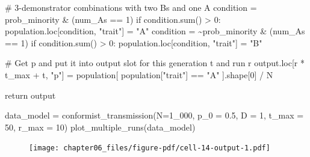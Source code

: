 \documentclass[
  a4paperpaper,
  ,captions=tableheading
]{scrbook}
\newenvironment{Shaded}{\begin{snugshade}}{\end{snugshade}}
\newcommand{\BuiltInTok}[1]{\textcolor[rgb]{0.00,0.23,0.31}{#1}}
\newcommand{\CommentTok}[1]{\textcolor[rgb]{0.37,0.37,0.37}{#1}}
\newcommand{\ControlFlowTok}[1]{\textcolor[rgb]{0.00,0.23,0.31}{#1}}
\newcommand{\DecValTok}[1]{\textcolor[rgb]{0.68,0.00,0.00}{#1}}
\newcommand{\FloatTok}[1]{\textcolor[rgb]{0.68,0.00,0.00}{#1}}
\newcommand{\NormalTok}[1]{\textcolor[rgb]{0.00,0.23,0.31}{#1}}
\newcommand{\OperatorTok}[1]{\textcolor[rgb]{0.37,0.37,0.37}{#1}}
\newcommand{\StringTok}[1]{\textcolor[rgb]{0.13,0.47,0.30}{#1}}
\begin{document}
\begin{Shaded}
\begin{Highlighting}[]
            \CommentTok{\# 3{-}demonstrator combinations with two B\textquotesingle{}s and one A}
\NormalTok{            condition }\OperatorTok{=}\NormalTok{ prob\_minority }\OperatorTok{\&}\NormalTok{ (num\_As }\OperatorTok{==} \DecValTok{1}\NormalTok{)}
            \ControlFlowTok{if}\NormalTok{ condition.}\BuiltInTok{sum}\NormalTok{() }\OperatorTok{\textgreater{}} \DecValTok{0}\NormalTok{:}
\NormalTok{                population.loc[condition, }\StringTok{"trait"}\NormalTok{] }\OperatorTok{=} \StringTok{"A"}
\NormalTok{            condition }\OperatorTok{=} \OperatorTok{\textasciitilde{}}\NormalTok{prob\_minority }\OperatorTok{\&}\NormalTok{ (num\_As }\OperatorTok{==} \DecValTok{1}\NormalTok{)}
            \ControlFlowTok{if}\NormalTok{ condition.}\BuiltInTok{sum}\NormalTok{() }\OperatorTok{\textgreater{}} \DecValTok{0}\NormalTok{:}
\NormalTok{                population.loc[condition, }\StringTok{"trait"}\NormalTok{] }\OperatorTok{=} \StringTok{"B"}
            
            \CommentTok{\# Get p and put it into output slot for this generation t and run r}
\NormalTok{            output.loc[r }\OperatorTok{*}\NormalTok{ t\_max }\OperatorTok{+}\NormalTok{ t, }\StringTok{"p"}\NormalTok{] }\OperatorTok{=}\NormalTok{ population[ population[}\StringTok{"trait"}\NormalTok{] }\OperatorTok{==} \StringTok{"A"}\NormalTok{ ].shape[}\DecValTok{0}\NormalTok{] }\OperatorTok{/}\NormalTok{ N}

    \ControlFlowTok{return}\NormalTok{ output}
\end{Highlighting}
\end{Shaded}

\begin{Shaded}
\begin{Highlighting}[]
\NormalTok{data\_model }\OperatorTok{=}\NormalTok{ conformist\_transmission(N}\OperatorTok{=}\DecValTok{1\_000}\NormalTok{, p\_0 }\OperatorTok{=} \FloatTok{0.5}\NormalTok{, D }\OperatorTok{=} \DecValTok{1}\NormalTok{, t\_max }\OperatorTok{=} \DecValTok{50}\NormalTok{, r\_max }\OperatorTok{=} \DecValTok{10}\NormalTok{)}
\NormalTok{plot\_multiple\_runs(data\_model)}
\end{Highlighting}
\end{Shaded}

\begin{figure}[H]

{\centering \texttt{[image: chapter06\_files/figure-pdf/cell-14-output-1.pdf]}

}

\end{figure}
\end{document}
